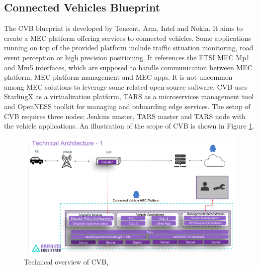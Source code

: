 \documentclass[12pt,a4paper,twoside]{report}
\begin{document}
\subsection{Connected Vehicles Blueprint}
The CVB blueprint is developed by Tencent, Arm, Intel and Nokia. It aims to create a MEC platform offering services to connected vehicles. Some applications running on top of the provided platform include traffic situation monitoring, road event perception or high precision positioning. It references the ETSI MEC Mp1 and Mm5 interfaces, which are supposed to handle communication between MEC platform, MEC platform management and MEC apps. It is not uncommon among MEC solutions to leverage some related open-source software, CVB uses StarlingX as a virtualization platform, TARS as a microservices management tool and OpenNESS toolkit for managing and onboarding edge services. The setup of CVB requires three nodes: Jenkins master, TARS master and TARS node with the vehicle applications. An illustration of the scope of CVB is shown in Figure \ref{F:cvb}. \cite{cvb-docu}
\begin{figure}[ht]
	\centering
	\includegraphics[width=\textwidth]{./images/akraino-cvb.png}
	\caption{Technical overview of CVB, \cite{cvb-docu}}
	\label{F:cvb}
\end{figure}
\end{document}
